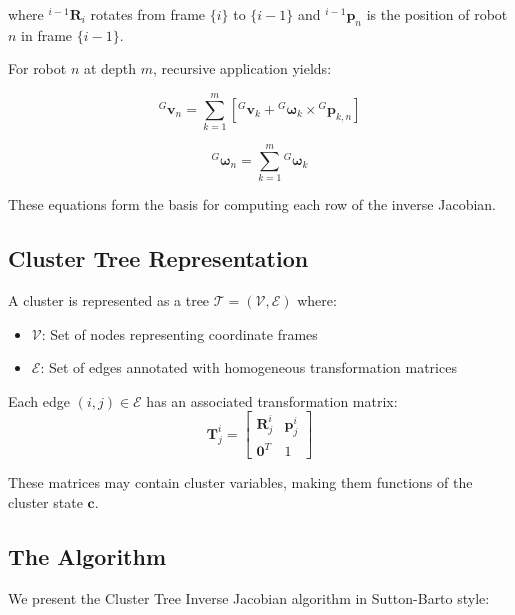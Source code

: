 \documentclass[lettersize,journal]{IEEEtran}
\begin{document}
where ${}^{i-1}\mathbf{R}_i$ rotates from frame $\{i\}$ to $\{i-1\}$ and ${}^{i-1}\mathbf{p}_n$ is the position of robot $n$ in frame $\{i-1\}$.

For robot $n$ at depth $m$, recursive application yields:

\begin{equation}
{}^G\mathbf{v}_n = \sum_{k=1}^{m} \left[ {}^G\mathbf{v}_k + {}^G\boldsymbol{\omega}_k \times {}^G\mathbf{p}_{k,n} \right]
\end{equation}

\begin{equation}
{}^G\boldsymbol{\omega}_n = \sum_{k=1}^{m} {}^G\boldsymbol{\omega}_k
\end{equation}

These equations form the basis for computing each row of the inverse Jacobian.

\subsection{Cluster Tree Representation}

A cluster is represented as a tree $\mathcal{T} = (\mathcal{V}, \mathcal{E})$ where:
\begin{itemize}
\item $\mathcal{V}$: Set of nodes representing coordinate frames
\item $\mathcal{E}$: Set of edges annotated with homogeneous transformation matrices
\end{itemize}

Each edge $(i, j) \in \mathcal{E}$ has an associated transformation matrix:
\begin{equation}
\mathbf{T}_{j}^{i} = \begin{bmatrix}
\mathbf{R}_{j}^{i} & \mathbf{p}_{j}^{i} \\
\mathbf{0}^T & 1
\end{bmatrix}
\end{equation}

These matrices may contain cluster variables, making them functions of the cluster state $\mathbf{c}$.

\subsection{The Algorithm}

We present the Cluster Tree Inverse Jacobian algorithm in Sutton-Barto style:
\end{document}
